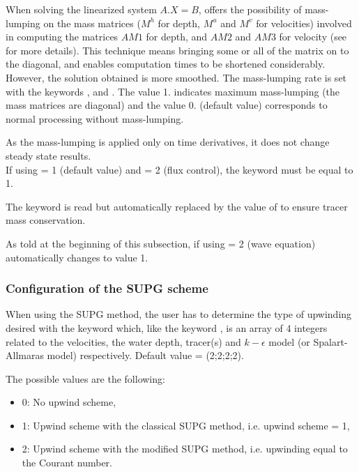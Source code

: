 When solving the linearized system $A.X = B$,  offers the
possibility of mass-lumping on the mass matrices
($M^h$ for depth, $M^u$ and $M^v$ for velocities) involved in computing the
matrices $AM1$ for depth, and $AM2$ and $AM3$ for velocity
(see \cite{Hervouet2007} for more details).
This technique means bringing some or all of the matrix on to the diagonal,
and enables computation times to be shortened considerably.
However, the solution obtained is more smoothed.
The mass-lumping rate is set with the keywords ,
 and
.
The value 1. indicates maximum mass-lumping (the mass matrices are diagonal)
and the value 0. (default value) corresponds to normal processing
without mass-lumping.

As the mass-lumping is applied only on time derivatives,
it does not change steady state results.\\

If using  = 1 (default value)
and  = 2 (flux control),
the keyword  must be equal to 1.

The keyword  is read but automatically replaced
by the value of  to ensure tracer mass conservation.

As told at the beginning of this subsection, if using
 = 2 (wave equation) automatically
changes  to value 1.


\subsubsection{Configuration of the SUPG scheme}

When using the SUPG method, the user has to determine the type of upwinding
desired with the keyword  which, like the keyword
, is an array of 4 integers
related to the velocities, the water depth, tracer(s) and $k-\epsilon$ model
(or Spalart-Allmaras model) respectively.
Default value = (2;2;2;2).

The possible values are the following:

\begin{itemize}
\item 0: No upwind scheme,

\item 1: Upwind scheme with the classical SUPG method,
i.e. upwind scheme = 1,

\item 2: Upwind scheme with the modified SUPG method,
i.e. upwinding equal to the Courant number.
\end{itemize}


